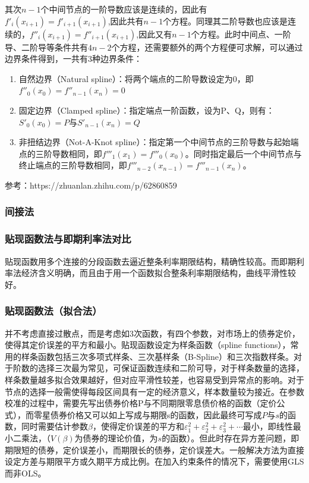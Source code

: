 \documentclass[11pt]{article}
\begin{document}
其次$n-1$个中间节点的一阶导数应该是连续的，因此有$f'_i(x_{i+1}) = f'_{i+1}(x_{i+1})$,因此共有$n-1$个方程。同理其二阶导数也应该是连续的，$f''_i(x_{i+1}) = f''_{i+1}(x_{i+1})$,因此又有$n-1$个方程。此时中间点、一阶导、二阶导等条件共有$4n-2$个方程，还需要额外的两个方程便可求解，可以通过边界条件得到，一共有3种边界条件：
\begin{enumerate}
    \item 自然边界（Natural spline）：将两个端点的二阶导数设定为0，即$f''_0(x_0)=f''_{n-1}(x_n)=0$
    \item 固定边界（Clamped spline）：指定端点一阶函数，设为P、Q，则有：$S'_0(x_0)=P$与$S'_{n-1}(x_n)=Q$
    \item 非扭结边界（Not-A-Knot spline）：指定第一个中间节点的三阶导数与起始端点的三阶导数相同，即$f'''_1(x_1)=f'''_0(x_0)$。同时指定最后一个中间节点与终止端点的三阶导数相同，即$f'''_{n-2}(x_{n-1})=f'''_{n-1}(x_n)$。
\end{enumerate}

参考：https://zhuanlan.zhihu.com/p/62860859

\subsubsection{间接法}

\subsubsection*{贴现函数法与即期利率法对比}

贴现函数用多个连接的分段函数去逼近整条利率期限结构，精确性较高。而即期利率法经济含义明确，而且由于用一个函数拟合整条利率期限结构，曲线平滑性较好。

\subsubsection{贴现函数法（拟合法）}

并不考虑直接过散点，而是考虑如3次函数，有四个参数，对市场上的债券定价，使得其定价误差的平方和最小。贴现函数设定为样条函数（spline functions），常用的样条函数包括三次多项式样条、三次基样条（B-Spline）和三次指数样条。对于阶数的选择三次最为常见，可保证函数连续和二阶可导，对于样条数量的选择，样条数量越多拟合效果越好，但对应平滑性较差，也容易受到异常点的影响。对于节点的选择一般需使得每段区间具有一定的经济意义，样本数量较为接近。在参数校准的过程中，需要先写出债券价格P与不同期限零息债价格的函数（定价公式），而零星债券价格又可以如上写成与期限s的函数，因此最终可写成$P$与$s$的函数，同时需要估计参数$\beta$，使得定价误差的平方和$\varepsilon_1^2+\varepsilon_2^2+\varepsilon_3^2+⋯$最小，即线性最小二乘法，（$V(\beta)$为债券的理论价值，为$s$的函数）。但此时存在异方差问题，即期限短的债券，定价误差小，而期限长的债券，定价误差大。一般解决方法为直接设定方差与期限平方或久期平方成比例。在加入约束条件的情况下，需要使用GLS而非OLS。
\end{document}
